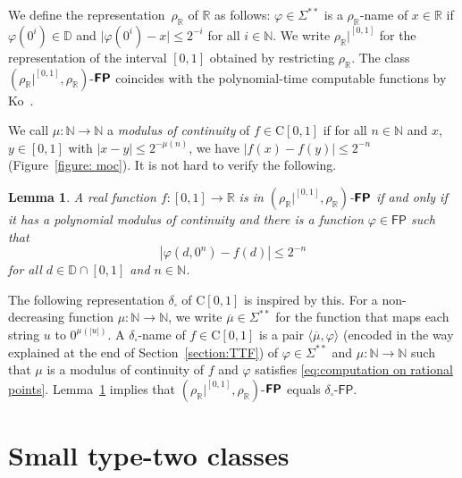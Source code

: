 \documentclass[conference]{IEEEtran}
\newcommand{\R}{\mathbb R}
\newcommand{\N}{\mathbb N}
\newcommand{\D}{\mathbb D}
\newcommand{\classonefont}[1]{\mathsf{#1}}
\newcommand{\classFP}{\classonefont{FP}}
\newcommand{\classtwofont}[1]{\text{\bfseries \sffamily \upshape #1}}
\newcommand{\classFPtwo}{\classtwofont{FP}}
\newcommand{\deltabox}{\delta _\square}
\newcommand{\rhoR}{\rho _\R}
\newcommand{\classC}{\mathrm C}
\newcommand{\LM}{\varSigma ^{**}}
\newtheorem{lemma}[theorem]{Lemma}
\theoremstyle{definition}
\theoremstyle{remark}
\begin{document}
We define the representation~$\rhoR$ of $\R$ as follows: 
$\varphi \in \LM$ is a $\rhoR$-name of $x \in \R$ 
if $\varphi(0^i) \in \D$ and $\lvert \varphi(0^i) - x \rvert \le 2^{-i}$
for all $i \in \N$.
We write $\rhoR|^{[0,1]}$ for the representation of the interval $[0, 1]$ 
obtained by restricting $\rhoR$.
The class $(\rhoR|^{[0,1]},\rhoR)$-$\classFPtwo$ 
coincides with 
the polynomial-time computable functions by Ko~\cite{ko1991complexity}. 

We call $\mu \colon \N \to \N$ a {\em modulus of continuity} 
of $f \in \classC [0, 1]$ 
if 
for all $n \in \N$ and $x$, $y \in [0,1]$ with
$|x - y| \le 2^{-\mu(n)}$, 
we have $|f(x) - f(y)| \le 2^{-n}$ (Figure~\ref{figure: moc}). 
It is not hard to verify the following. 

\begin{lemma}
 \label{lem:type1representation}
 A real function $f \colon [0, 1] \to \R$ 
 is in $(\rhoR|^{[0,1]},\rhoR)$-$\classFPtwo$ if and only if
 it has a polynomial modulus of continuity 
 and there is a function $\varphi \in \classFP$ such that 
 \begin{equation}
   \label{eq:computation on rational points}
  |\varphi(d, 0^n) - f(d)| \le 2^{-n} 
 \end{equation}
 for all $d \in \D \cap [0,1]$ and $n \in \N$. 
\end{lemma}

The following representation $\deltabox$ of $\classC[0,1]$ 
is inspired by this. 
For a non-decreasing function $\mu \colon \N \to \N$, 
we write $\overline \mu \in \LM$ for the 
function that maps each string $u$ to $0^{\mu(|u|)}$.
A $\deltabox$-name of $f \in \classC[0,1]$ is 
a pair $\langle \overline{\mu}, \varphi \rangle$
(encoded in the way explained at the end of Section~\ref{section:TTF})
of $\varphi \in \LM$ and $\mu \colon \N \to \N$
such that 
$\mu$ is a modulus of continuity of $f$
and $\varphi$ satisfies \eqref{eq:computation on rational points}.
Lemma~\ref{lem:type1representation} implies that
$(\rhoR|^{[0,1]},\rhoR)$-$\classFPtwo$ equals
$\deltabox$-$\classFP$. 

\section{Small type-two classes}
\label{section:small-classes}
\end{document}
